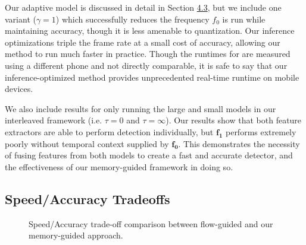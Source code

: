 \documentclass[10pt,twocolumn,letterpaper]{article}
\begin{document}
Our adaptive model is discussed in detail in Section \hyperref[sec:4.3]{4.3}, but we include one variant ($\gamma=1$) which successfully reduces the frequency $f_0$ is run while maintaining accuracy, though it is less amenable to quantization. Our inference optimizations triple the frame rate at a small cost of accuracy, allowing our method to run much faster in practice. Though the runtimes for \cite{zhu2018towardsmobile} are measured using a different phone and not directly comparable, it is safe to say that our inference-optimized method provides unprecedented real-time runtime on mobile devices.

We also include results for only running the large and small models in our interleaved framework (i.e. $\tau=0$ and $\tau=\infty$). Our results show that both feature extractors are able to perform detection individually, but $\mathbf{f_1}$ performs extremely poorly without temporal context supplied by $\mathbf{f_0}$. This demonstrates the necessity of fusing features from both models to create a fast and accurate detector, and the effectiveness of our memory-guided framework in doing so.


\subsection{Speed/Accuracy Tradeoffs}
\begin{figure}[t]
\centering
{}
\centering
\vspace{-.5em}
\caption{Speed/Accuracy trade-off comparison between flow-guided and our memory-guided approach.}
\label{fig:ratio}
\end{figure}
\end{document}
